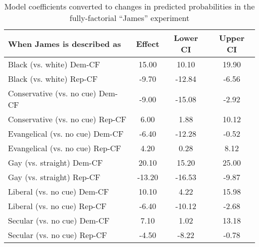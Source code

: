 \begin{table}[!htb]
\centering
\caption{Model coefficients converted to changes in predicted probabilities in the fully-factorial ``James'' experiment} 
\label{tab:logit_james_pp}
\begingroup\small
\begin{tabular}{lccc}
  \hline
When James is described as & Effect & Lower CI & Upper CI \\ 
  \hline
Black (vs. white) Dem-CF & 15.00 & 10.10 & 19.90 \\ 
  Black (vs. white) Rep-CF & -9.70 & -12.84 & -6.56 \\ 
  Conservative (vs. no cue) Dem-CF & -9.00 & -15.08 & -2.92 \\ 
  Conservative (vs. no cue) Rep-CF & 6.00 & 1.88 & 10.12 \\ 
  Evangelical (vs. no cue) Dem-CF & -6.40 & -12.28 & -0.52 \\ 
  Evangelical (vs. no cue) Rep-CF & 4.20 & 0.28 & 8.12 \\ 
  Gay (vs. straight) Dem-CF & 20.10 & 15.20 & 25.00 \\ 
  Gay (vs. straight) Rep-CF & -13.20 & -16.53 & -9.87 \\ 
  Liberal (vs. no cue) Dem-CF & 10.10 & 4.22 & 15.98 \\ 
  Liberal (vs. no cue) Rep-CF & -6.40 & -10.12 & -2.68 \\ 
  Secular (vs. no cue) Dem-CF & 7.10 & 1.02 & 13.18 \\ 
  Secular (vs. no cue) Rep-CF & -4.50 & -8.22 & -0.78 \\ 
   \hline
\end{tabular}
\endgroup
\end{table}
